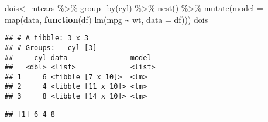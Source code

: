 \documentclass[
]{book}
\newenvironment{Shaded}{\begin{snugshade}}{\end{snugshade}}
\newcommand{\AttributeTok}[1]{\textcolor[rgb]{0.77,0.63,0.00}{#1}}
\newcommand{\ControlFlowTok}[1]{\textcolor[rgb]{0.13,0.29,0.53}{\textbf{#1}}}
\newcommand{\FunctionTok}[1]{\textcolor[rgb]{0.00,0.00,0.00}{#1}}
\newcommand{\NormalTok}[1]{#1}
\newcommand{\OtherTok}[1]{\textcolor[rgb]{0.56,0.35,0.01}{#1}}
\newcommand{\SpecialCharTok}[1]{\textcolor[rgb]{0.00,0.00,0.00}{#1}}
\begin{document}
\begin{Shaded}
\begin{Highlighting}[]
\NormalTok{dois}\OtherTok{\textless{}{-}}\NormalTok{ mtcars }\SpecialCharTok{\%\textgreater{}\%} 
  \FunctionTok{group\_by}\NormalTok{(cyl) }\SpecialCharTok{\%\textgreater{}\%} 
  \FunctionTok{nest}\NormalTok{() }\SpecialCharTok{\%\textgreater{}\%} 
  \FunctionTok{mutate}\NormalTok{(}\AttributeTok{model =} \FunctionTok{map}\NormalTok{(data, }\ControlFlowTok{function}\NormalTok{(df) }\FunctionTok{lm}\NormalTok{(mpg }\SpecialCharTok{\textasciitilde{}}\NormalTok{ wt, }\AttributeTok{data =}\NormalTok{ df)))}
\NormalTok{dois}
\end{Highlighting}
\end{Shaded}

\begin{verbatim}
## # A tibble: 3 x 3
## # Groups:   cyl [3]
##     cyl data               model 
##   <dbl> <list>             <list>
## 1     6 <tibble [7 x 10]>  <lm>  
## 2     4 <tibble [11 x 10]> <lm>  
## 3     8 <tibble [14 x 10]> <lm>
\end{verbatim}

\begin{Shaded}
\end{Shaded}

\begin{verbatim}
## [1] 6 4 8
\end{verbatim}

\begin{Shaded}
\end{Shaded}
\end{document}
